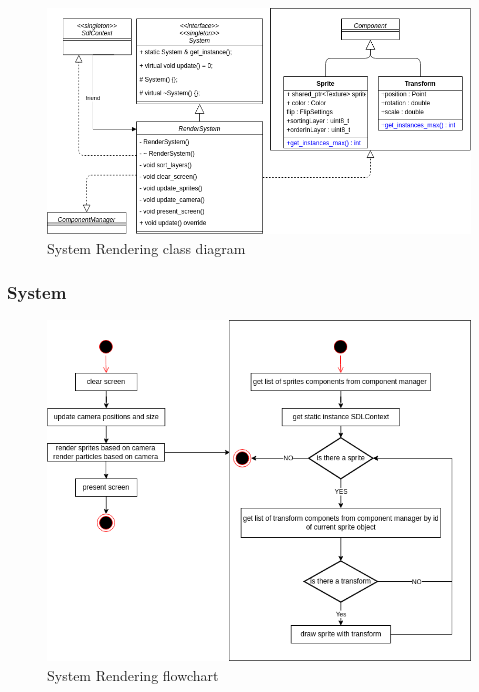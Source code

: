 \documentclass{projdoc}
\begin{document}
\begin{figure}
	\centering
	\includegraphics[width=\textwidth]{img/Rendering.png}
	\caption{System Rendering class diagram}
	\label{fig:class-rendering}
\end{figure}

\subsubsection{System}

\begin{figure}
	\centering
	\includegraphics[width=\textwidth]{img/flowchart_rendering.png}
	\caption{System Rendering flowchart }
	\label{fig:class-renderingflowchart}
\end{figure}


\end{document}
